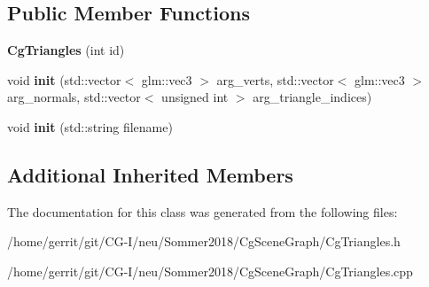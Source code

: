\subsection*{Public Member Functions}
\begin{DoxyCompactItemize}
\item 
\mbox{\label{class_cg_triangles_a562bd2e0ba58b8d806cc4a777dc9ebc3}} 
{\bfseries Cg\+Triangles} (int id)
\item 
\mbox{\label{class_cg_triangles_a85b282392bac332acc1b10f6c9bdcf86}} 
void {\bfseries init} (std\+::vector$<$ glm\+::vec3 $>$ arg\+\_\+verts, std\+::vector$<$ glm\+::vec3 $>$ arg\+\_\+normals, std\+::vector$<$ unsigned int $>$ arg\+\_\+triangle\+\_\+indices)
\item 
\mbox{\label{class_cg_triangles_aead23176318d26112db942c3420cde3f}} 
void {\bfseries init} (std\+::string filename)
\end{DoxyCompactItemize}
\subsection*{Additional Inherited Members}


The documentation for this class was generated from the following files\+:\begin{DoxyCompactItemize}
\item 
/home/gerrit/git/\+C\+G-\/\+I/neu/\+Sommer2018/\+Cg\+Scene\+Graph/Cg\+Triangles.\+h\item 
/home/gerrit/git/\+C\+G-\/\+I/neu/\+Sommer2018/\+Cg\+Scene\+Graph/Cg\+Triangles.\+cpp\end{DoxyCompactItemize}
